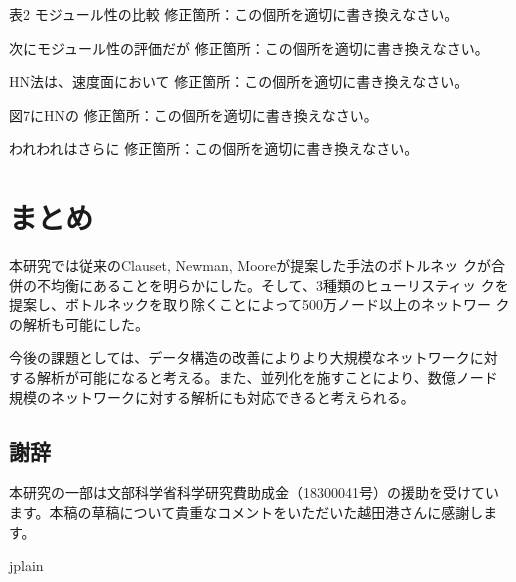 \documentclass [a4j,11pt] {jsarticle}
\begin{document}
\begin {table}
\begin {空欄ブロック}{表2 モジュール性の比較}
修正箇所：この個所を適切に書き換えなさい。
\end {空欄ブロック}
\end {table}

\begin {空欄ブロック}{次にモジュール性の評価だが}
修正箇所：この個所を適切に書き換えなさい。
\end {空欄ブロック}

\begin {空欄ブロック}{HN法は、速度面において}
修正箇所：この個所を適切に書き換えなさい。
\end {空欄ブロック}

\begin {空欄ブロック}{図7にHNの}
修正箇所：この個所を適切に書き換えなさい。
\end {空欄ブロック}

\begin {空欄ブロック}{われわれはさらに}
修正箇所：この個所を適切に書き換えなさい。
\end {空欄ブロック}


\section {まとめ}
\label {sect: summary}

本研究では従来のClauset, Newman, Mooreが提案した手法のボトルネッ
クが合併の不均衡にあることを明らかにした。そして、3種類のヒューリスティッ
クを提案し、ボトルネックを取り除くことによって500万ノード以上のネットワー
クの解析も可能にした。

今後の課題としては、データ構造の改善によりより大規模なネットワークに対
する解析が可能になると考える。また、並列化を施すことにより、数億ノード
規模のネットワークに対する解析にも対応できると考えられる。

\subsection*{謝辞}

本研究の一部は文部科学省科学研究費助成金（18300041号）の援助を受けてい
ます。本稿の草稿について貴重なコメントをいただいた越田港さんに感謝しま
す。


 {jplain} %
\end{document}
